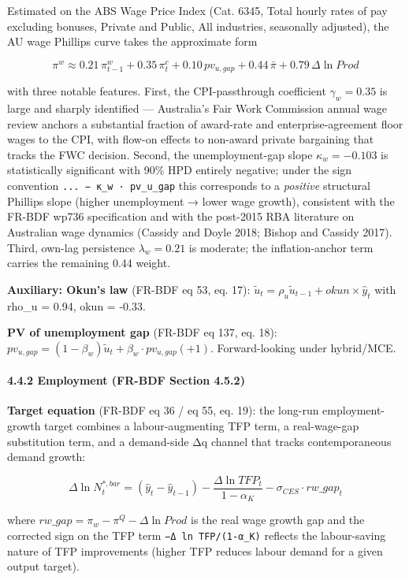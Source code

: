 \documentclass[
]{article}
\begin{document}
Estimated on the ABS Wage Price Index (Cat. 6345, Total hourly rates of
pay excluding bonuses, Private and Public, All industries, seasonally
adjusted), the AU wage Phillips curve takes the approximate form

\[\pi^w \approx 0.21 \, \pi^w_{t-1} + 0.35 \, \pi^c_t + 0.10 \, pv_{u,gap} + 0.44 \, \bar{\pi} + 0.79 \, \Delta \ln Prod\]

with three notable features. First, the CPI-passthrough coefficient
\(\gamma_w = 0.35\) is large and sharply identified --- Australia's Fair
Work Commission annual wage review anchors a substantial fraction of
award-rate and enterprise-agreement floor wages to the CPI, with flow-on
effects to non-award private bargaining that tracks the FWC decision.
Second, the unemployment-gap slope \(\kappa_w = -0.103\) is
statistically significant with 90\% HPD entirely negative; under the
sign convention \texttt{...\ −\ κ\_w\ ·\ pv\_u\_gap} this corresponds to
a \emph{positive} structural Phillips slope (higher unemployment → lower
wage growth), consistent with the FR-BDF wp736 specification and with
the post-2015 RBA literature on Australian wage dynamics (Cassidy and
Doyle 2018; Bishop and Cassidy 2017). Third, own-lag persistence
\(\lambda_w = 0.21\) is moderate; the inflation-anchor term carries the
remaining 0.44 weight.

\textbf{Auxiliary: Okun's law} (FR-BDF eq 53, eq. 17):
\(\tilde{u}_t = \rho_u \tilde{u}_{t-1} + okun \times \hat{y}_t\) with
rho\_u = 0.94, okun = -0.33.

\textbf{PV of unemployment gap} (FR-BDF eq 137, eq. 18):
\(pv_{u,gap} = (1-\beta_w) \tilde{u}_t + \beta_w \cdot pv_{u,gap}(+1)\).
Forward-looking under hybrid/MCE.

\paragraph{4.4.2 Employment (FR-BDF Section
4.5.2)}\label{employment-fr-bdf-section-4.5.2}

\textbf{Target equation} (FR-BDF eq 36 / eq 55, eq. 19): the long-run
employment-growth target combines a labour-augmenting TFP term, a
real-wage-gap substitution term, and a demand-side Δq channel that
tracks contemporaneous demand growth:

\[\Delta \ln N^{*,bar}_t = (\hat{y}_t - \hat{y}_{t-1}) - \frac{\Delta \ln TFP_t}{1-\alpha_K} - \sigma_{CES} \cdot rw\_gap_t\]

where \(rw\_gap = \pi_w - \pi^Q - \Delta \ln Prod\) is the real wage
growth gap and the corrected sign on the TFP term
\texttt{−Δ\ ln\ TFP/(1-α\_K)} reflects the labour-saving nature of TFP
improvements (higher TFP reduces labour demand for a given output
target).
\end{document}

